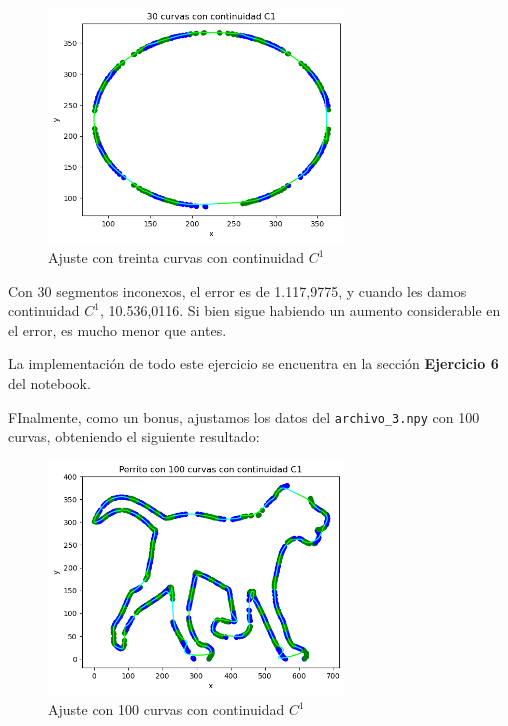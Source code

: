 \documentclass{article}
\begin{document}
\begin{figure}[H]
    \centering
    \includegraphics[width=0.7\textwidth]{Imagenes/30_c1.png}
    \caption{Ajuste con treinta curvas con continuidad $C^1$}
\end{figure}

Con 30 segmentos inconexos, el error es de 1.117,9775, y cuando les damos continuidad $C^1$, 10.536,0116. Si bien sigue habiendo un aumento considerable en el error, es mucho menor que antes.

La implementación de todo este ejercicio se encuentra en la sección \textbf{Ejercicio 6} del notebook.

FInalmente, como un bonus, ajustamos los datos del \texttt{archivo\_3.npy} con 100 curvas, obteniendo el siguiente resultado:
\begin{figure}[H]
    \centering
    \includegraphics[width=0.7\textwidth]{Imagenes/perrito.png}
    \caption{Ajuste con 100 curvas con continuidad $C^1$}
\end{figure}
\end{document}
